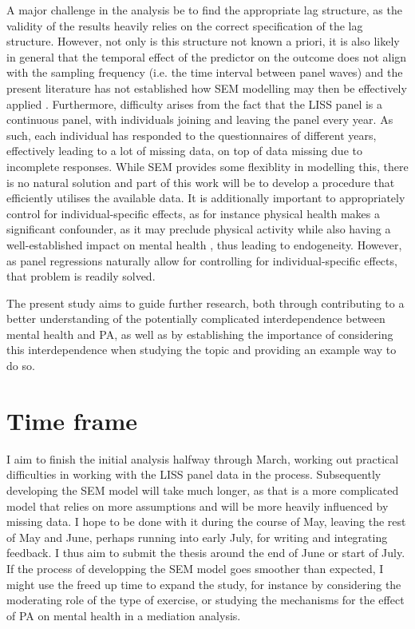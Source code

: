 \documentclass[a4paper,11pt]{report}
\begin{document}
A major challenge in the analysis be to find the appropriate lag structure, as the validity of the results heavily
relies on the correct specification of the lag structure. However, not only is this structure not known a priori,
it is also likely in general that the temporal effect of the predictor on the outcome does not align with the sampling
frequency (i.e. the time interval between panel waves) and the present literature has not established how SEM modelling
may then be effectively applied \cite{leszczensky2022deal}.
Furthermore, difficulty arises from the fact that the LISS panel is a continuous panel, with individuals joining and
leaving the panel every year. As such, each individual has responded to the questionnaires of different years,
effectively leading to a lot of missing data, on top of data missing due to incomplete responses.
While SEM provides some flexiblity in modelling this, there is no natural solution and part of this work will be to
develop a procedure that efficiently utilises the available data.
It is additionally important to appropriately control for individual-specific effects, as for instance physical
health makes a significant confounder, as it may preclude physical activity while also having a well-established impact
on mental health \cite{ohrnberger2017relationship}, thus leading to endogeneity. However, as panel regressions naturally
allow for controlling for individual-specific effects, that problem is readily solved.

The present study aims to guide further research, both through contributing to a better understanding of the potentially
complicated interdependence between mental health and PA, as well as by establishing the importance of considering this
interdependence when studying the topic and providing an example way to do so.

\pagebreak
\section*{Time frame}
I aim to finish the initial analysis halfway through March, working out practical difficulties in working with the LISS
panel data in the process.
Subsequently developing the SEM model will take much longer, as that is a more complicated model that relies on more
assumptions and will be more heavily influenced by missing data.
I hope to be done with it during the course of May, leaving the rest of May and June, perhaps running into early July,
for writing and integrating feedback. I thus aim to submit the thesis around the end of June or start of July.
If the process of developping the SEM model goes smoother than expected, I might use the freed up time to expand the study,
for instance by considering the moderating role of the type of exercise, or studying the mechanisms for the effect of PA
on mental health in a mediation analysis.




\end{document}
